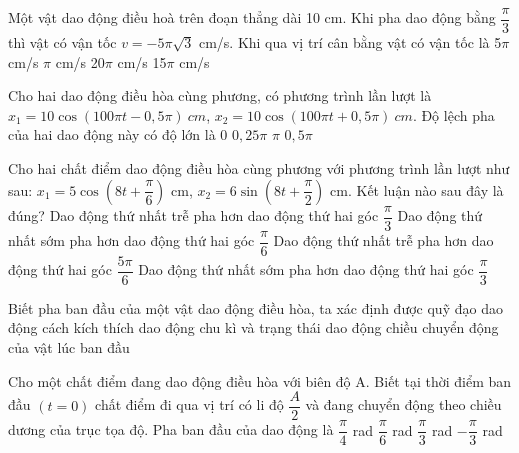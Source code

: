 \begin{ex}%
Một vật dao động điều hoà trên đoạn thẳng dài 10 cm. Khi pha dao động bằng $\dfrac{\pi}{3}$ thì vật có vận tốc $v = -5\pi \sqrt{3}$ cm/s. Khi qua vị trí cân bằng vật có vận tốc là
\choice 
{5$\pi$ cm/s}
{$\pi$ cm/s}
{20$\pi$ cm/s}
{15$\pi$ cm/s}
\end{ex} 
\begin{ex}%
 Cho hai dao động điều hòa cùng phương, có phương trình lần lượt là $x_1=10\cos\left(100\pi t-0,5\pi\right)\ cm$, $x_2=10\cos\left(100\pi t+0,5\pi\right)\ cm $. Độ lệch pha của hai dao động này có độ lớn là
\choice
{0}
{$0,25\pi$}
{\True $\pi$}
{$0,5\pi$}
\end{ex} 
\begin{ex}%
Cho hai chất điểm dao động điều hòa cùng phương với phương trình lần lượt như sau: $x_1 = 5\cos\left(8t + \dfrac{\pi}{6}\right)$ cm, $x_2 = 6\sin\left(8t + \dfrac{\pi}{2}\right)$ cm. Kết luận nào sau đây là đúng?
\choice
{Dao động thứ nhất trễ pha hơn dao động thứ hai góc $\dfrac{\pi}{3}$}
{\True Dao động thứ nhất sớm pha hơn dao động thứ hai góc $\dfrac{\pi}{6}$}
{Dao động thứ nhất trễ pha hơn dao động thứ hai góc $\dfrac{5\pi}{6}$}
{Dao động thứ nhất sớm pha hơn dao động thứ hai góc $\dfrac{\pi}{3}$}
\end{ex} 
\begin{ex}%
Biết pha ban đầu của một vật dao động điều hòa, ta xác định được
\choice
{quỹ đạo dao động}
{cách kích thích dao động}
{chu kì và trạng thái dao động}
{\True chiều chuyển động của vật lúc ban đầu}
\end{ex} 
\begin{ex}%
Cho một chất điểm đang dao động điều hòa với biên độ A. Biết tại thời điểm ban đầu $\left(t = 0\right)$ chất điểm đi qua vị trí có li độ $\dfrac{A}{2}$ và đang chuyển động theo chiều dương của trục tọa độ. Pha ban đầu của dao động là
\choice 
{$\dfrac{\pi}{4}$ rad}
{$\dfrac{\pi}{6}$ rad}
{$\dfrac{\pi}{3}$ rad}
{\True $-\dfrac{\pi}{3}$ rad}
\end{ex} 
 
